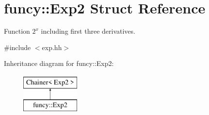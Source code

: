 \hypertarget{structfuncy_1_1Exp2}{\section{funcy\-:\-:Exp2 Struct Reference}
\label{structfuncy_1_1Exp2}
}


Function $2^x$ including first three derivatives.  




{\ttfamily \#include $<$exp.\-hh$>$}

Inheritance diagram for funcy\-:\-:Exp2\-:\begin{figure}[H]
\begin{center}
\leavevmode
\includegraphics[height=2.000000cm]{structfuncy_1_1Exp2}
\end{center}
\end{figure}
